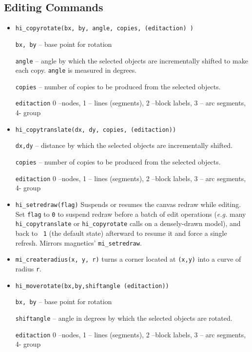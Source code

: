 \subsection{Editing Commands}
\begin{itemize}

\item \texttt{hi\_copyrotate(bx, by, angle, copies, (editaction) )}

\texttt{bx, by} -- base point for rotation

\texttt{angle} -- angle by which the selected objects are incrementally
shifted to make each copy. \texttt{angle} is measured in degrees.

\texttt{copies} -- number of copies to be produced from the selected
objects.

\texttt{editaction} 0 --nodes, 1 -- lines (segments), 2 --block labels, 3 --
arc segments, 4- group

\item \texttt{hi\_copytranslate(dx, dy, copies, (editaction))}

\texttt{dx,dy} -- distance by which the selected objects are incrementally
shifted.

\texttt{copies} -- number of copies to be produced from the selected
objects.

\texttt{editaction} 0 --nodes, 1 -- lines (segments), 2 --block labels, 3 --
arc segments, 4- group

\item{\tt hi\_setredraw(flag)} Suspends or resumes the canvas redraw
while editing. Set {\tt flag} to {\tt 0} to suspend redraw before a
batch of edit operations ({\em e.g.} many {\tt hi\_copytranslate} or
{\tt hi\_copyrotate} calls on a densely-drawn model), and back to {\tt
1} (the default state) afterward to resume it and force a single
refresh. Mirrors magnetics' {\tt mi\_setredraw}.

\item{\tt mi\_createradius(x, y, r)} turns a corner located at {\tt (x,y)} into a curve of radius {\tt r}.

\item \texttt{hi\_moverotate(bx,by,shiftangle (editaction))}

\texttt{bx, by} -- base point for rotation

\texttt{shiftangle} -- angle in degrees by which the selected objects are
rotated.

\texttt{editaction} 0 --nodes, 1 -- lines (segments), 2 --block labels, 3 --
arc segments, 4- group


\end{itemize}
